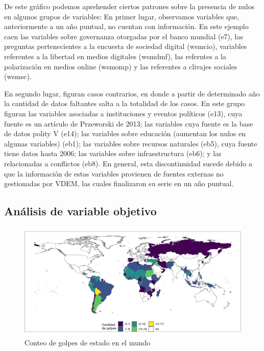 \documentclass{article}
\begin{document}
De este gráfico podemos aprehender ciertos patrones sobre la presencia de nulos
en algunos grupos de variables: En primer lugar, observamos variables que,
anteriormente a un año puntual, no cuentan con información. En este ejemplo caen
las variables sobre governanza otorgadas por el banco mundial (e7), las preguntas
pertenecientes a la encuesta de sociedad digital (wsmcio), variables referentes a
la libertad en medios digitales (wsmdmf), las referntes a la polarización en medios
online (wsmomp) y las referentes a clivajes sociales (wsmsc).

En segundo lugar, figuran casos contrarios, en donde a partir de determinado año
la cantidad de datos faltantes salta a la totalidad de los casos. En este grupo
figuran las variables asociadas a instituciones y eventos políticos (e13), cuya 
fuente es un artículo de Przeworski de 2013; las variables cuya fuente es la base
de datos polity V (e14); las variables sobre educación (aumentan los nulos en algunas 
variables) (eb1); las variables sobre recursos naturales (eb5), cuya fuente tiene
datos hasta 2006; las variables sobre infraestructura (eb6); y las relacionadas a 
conflictos (eb8). En general, esta discontinuidad sucede debido a que la información
de estas variables provienen de fuentes externas no gestionadas por VDEM, las cuales
finalizaron su serie en un año puntual.

\subsection{Análisis de variable objetivo}

\begin{figure}[H]
  \centering  
  \includegraphics[width=1\textwidth]{2_golpes.png}
  \caption{Conteo de golpes de estado en el mundo}
\end{figure}
\end{document}
